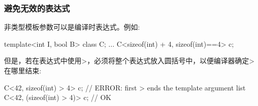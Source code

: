 \subsubsection{避免无效的表达式}

非类型模板参数可以是编译时表达式。例如:

\begin{cpp}
template<int I, bool B>
class C;
...
C<sizeof(int) + 4, sizeof(int)==4> c;
\end{cpp}

但是，若在表达式中使用>，必须将整个表达式放入圆括号中，以便编译器确定>在哪里结束:

\begin{cpp}
C<42, sizeof(int) > 4> c; // ERROR: first > ends the template argument list
C<42, (sizeof(int) > 4)> c; // OK
\end{cpp}











